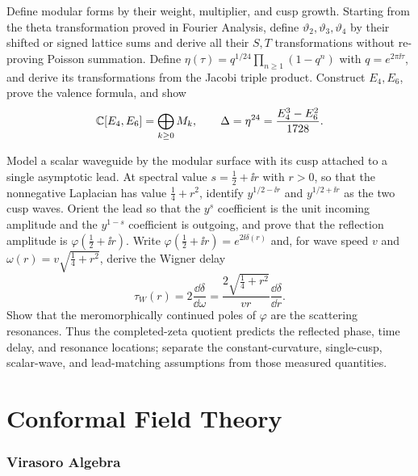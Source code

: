 \begin{exercise}
Define modular forms by their weight, multiplier, and cusp growth.  Starting
from the theta transformation proved in Fourier Analysis, define
$\vartheta_2,\vartheta_3,\vartheta_4$ by their shifted or signed lattice sums
and derive all their $S,T$ transformations without re-proving Poisson
summation.  Define
$\eta(\tau)=q^{1/24}\prod_{n\ge1}(1-q^n)$ with
$q=e^{2\pi\ii\tau}$, and derive its transformations from the Jacobi triple
product.  Construct $E_4,E_6$, prove the valence formula, and show
\[
 \mathbb C[E_4,E_6]=\bigoplus_{k\ge0}M_k,\qquad
 \Delta=\eta^{24}=\frac{E_4^3-E_6^2}{1728}.
\]
\end{exercise}

\begin{exercise}
Model a scalar waveguide by the modular surface with its cusp attached to a
single asymptotic lead.  At spectral value
$s=\tfrac12+\ii r$ with $r>0$, so that the nonnegative Laplacian has value
$\tfrac14+r^2$, identify $y^{1/2-\ii r}$ and $y^{1/2+\ii r}$ as the two
cusp waves.  Orient the lead so that the $y^s$ coefficient is the unit
incoming amplitude and the $y^{1-s}$ coefficient is outgoing, and prove that
the reflection amplitude is
$\varphi(\tfrac12+\ii r)$.  Write
$\varphi(\tfrac12+\ii r)=e^{2\ii\delta(r)}$ and, for wave speed $v$ and
$\omega(r)=v\sqrt{\tfrac14+r^2}$, derive the Wigner delay
\[
 \tau_W(r)=2\frac{\dd\delta}{\dd\omega}
 =\frac{2\sqrt{\tfrac14+r^2}}{v r}\frac{\dd\delta}{\dd r}.
\]
Show that the meromorphically continued poles of $\varphi$ are the scattering
resonances.  Thus the completed-zeta quotient predicts the reflected phase,
time delay, and resonance locations; separate the constant-curvature,
single-cusp, scalar-wave, and lead-matching assumptions from those measured
quantities.
\end{exercise}

\part{Conformal Field Theory}

\section{Virasoro Algebra}


